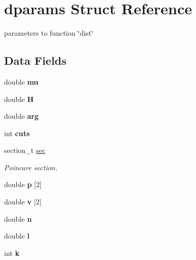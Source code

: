 \hypertarget{structdparams}{
\section{dparams Struct Reference}
\label{structdparams}
}


parameters to function \char`\"{}dist\char`\"{}  


\subsection*{Data Fields}
\begin{DoxyCompactItemize}
\item 
\hypertarget{structdparams_a74577585cf12d1712ab9c57616d49205}{
double {\bfseries mu}}
\label{structdparams_a74577585cf12d1712ab9c57616d49205}

\item 
\hypertarget{structdparams_a982cf43f120ff8978010e078bd49d9a3}{
double {\bfseries H}}
\label{structdparams_a982cf43f120ff8978010e078bd49d9a3}

\item 
\hypertarget{structdparams_aef0000238b70c60b2c49fda1cce93f14}{
double {\bfseries arg}}
\label{structdparams_aef0000238b70c60b2c49fda1cce93f14}

\item 
\hypertarget{structdparams_ae2a1c7717335e868b50d2cb44d017589}{
int {\bfseries cuts}}
\label{structdparams_ae2a1c7717335e868b50d2cb44d017589}

\item 
\hypertarget{structdparams_a8e9048bbbc09d262d70946d4658836b4}{
section\_\-t \hyperlink{structdparams_a8e9048bbbc09d262d70946d4658836b4}{sec}}
\label{structdparams_a8e9048bbbc09d262d70946d4658836b4}

\begin{DoxyCompactList}\small\item\em Poincare section. \item\end{DoxyCompactList}\item 
\hypertarget{structdparams_a58f19a06ee7e5035fd46ff6802fa7d54}{
double {\bfseries p} \mbox{[}2\mbox{]}}
\label{structdparams_a58f19a06ee7e5035fd46ff6802fa7d54}

\item 
\hypertarget{structdparams_a4d879e191135075c0e106d8e96633fac}{
double {\bfseries v} \mbox{[}2\mbox{]}}
\label{structdparams_a4d879e191135075c0e106d8e96633fac}

\item 
\hypertarget{structdparams_abe63e991a7bf5d666068b15c9064428d}{
double {\bfseries n}}
\label{structdparams_abe63e991a7bf5d666068b15c9064428d}

\item 
\hypertarget{structdparams_a59e80b8ba32c12c6d0a868f17a19ae48}{
double {\bfseries l}}
\label{structdparams_a59e80b8ba32c12c6d0a868f17a19ae48}

\item 
\hypertarget{structdparams_ab66ed8e0098c0a86b458672a55a9cca9}{
int {\bfseries k}}
\label{structdparams_ab66ed8e0098c0a86b458672a55a9cca9}

\end{DoxyCompactItemize}


